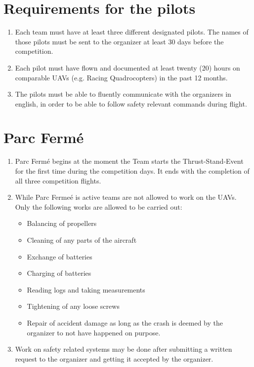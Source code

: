     \section{Requirements for the pilots}
    \begin{enumerate}
      \item Each team must have at least three different designated pilots. The names of those pilots must be sent to the organizer at least 
      30 days before the competition. 
      \item Each pilot must have flown and documented at least twenty (20) hours on comparable UAVs (e.g. Racing Quadrocopters) in the past 12 months.  
      \item The pilots must be able to fluently communicate with the organizers in english, in order to be able to follow safety relevant commands during flight.
    \end{enumerate}


    \section{Parc Fermé}
    \begin{enumerate}
      \item Parc Fermé begins at the moment the Team starts the Thrust-Stand-Event for the first time during the competition days. It ends with the completion of all three competition flights. 
      \item While Parc Fermeé is active teams are not allowed to work on the UAVs. Only the following works are allowed to be carried out: 
      \begin{itemize}
        \item Balancing of propellers
        \item Cleaning of any parts of the aircraft
        \item Exchange of batteries
        \item Charging of batteries 
        \item Reading logs and taking measurements
        \item Tightening of any loose screws
        \item Repair of accident damage as long as the crash is deemed by the organizer to not have happened on purpose. 
      \end{itemize}
      \item Work on safety related systems may be done after submitting a written request to the organizer and getting it accepted by the organizer. 
    \end{enumerate}
  
